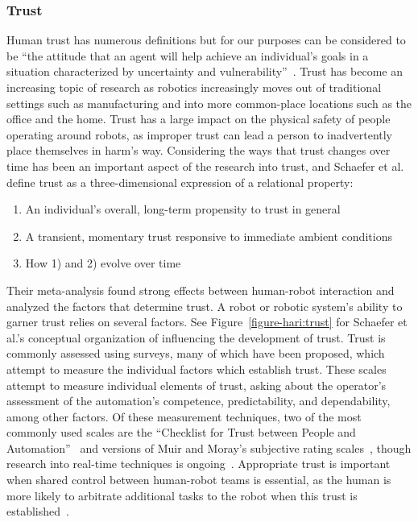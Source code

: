 \subsubsection{Trust}
Human trust has numerous definitions but for our purposes can be considered to be ``the attitude that an agent will help achieve an individual's goals in a situation characterized by uncertainty and vulnerability''~\citep{lee_trust_2004}.
Trust has become an increasing topic of research as robotics increasingly moves out of traditional settings such as manufacturing and into more common-place locations such as the office and the home.
Trust has a large impact on the physical safety of people operating around robots, as improper trust can lead a person to inadvertently place themselves in harm's way.
Considering the ways that trust changes over time has been an important aspect of the research into trust, and Schaefer et al. define trust as a three-dimensional expression of a relational property:
\begin{enumerate}
	\item An individual's overall, long-term propensity to trust in general
	\item A transient, momentary trust responsive to immediate ambient conditions
	\item How 1) and 2) evolve over time~\citep{schaefer_meta-analysis_2016}
\end{enumerate}
Their meta-analysis found strong effects between human-robot interaction and analyzed the factors that determine trust.
A robot or robotic system's ability to garner trust relies on several factors.
See Figure~\ref{figure-hari:trust} for Schaefer et al.'s conceptual organization of influencing the development of trust.
Trust is commonly assessed using surveys, many of which have been proposed, which attempt to measure the individual factors which establish trust.
These scales attempt to measure individual elements of trust, asking about the operator's assessment of the automation's competence, predictability, and dependability, among other factors.
Of these measurement techniques, two of the most commonly used scales are the ``Checklist for Trust between People and Automation''~\citep{jian_foundations_2000} and versions of Muir and Moray's subjective rating scales~\citep{muir_trust_1996}, though research into real-time techniques is ongoing~\citep{SEPPELT201966}.
Appropriate trust is important when shared control between human-robot teams is essential, as the human is more likely to arbitrate additional tasks to the robot when this trust is established~\citep{losey_review_2018}.

